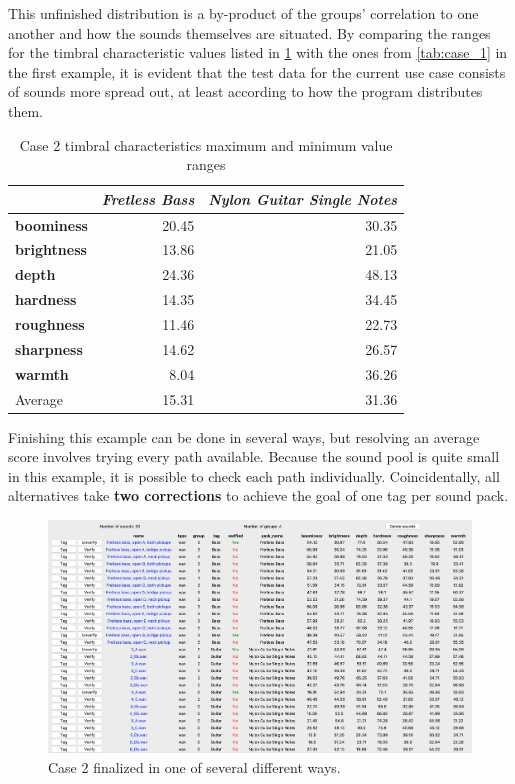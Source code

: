 This unfinished distribution is a by-product of the groups' correlation to one another and how the sounds themselves are situated. By comparing the ranges for the timbral characteristic values listed in \cref{tab:case_2} with the ones from \cref{tab:case_1} in the first example, it is evident that the test data for the current use case consists of sounds more spread out, at least according to how the program distributes them.
\begin{table}[ht]
    \caption[Case 2 timbral characteristics max and min ranges]{Case 2 timbral characteristics maximum and minimum value ranges}\label{tab:case_2}
    \begin{tabular*}{\textwidth}{@{\extracolsep{\fill}}lrr}
        \toprule
        & \emph{Fretless Bass} & \emph{Nylon Guitar Single Notes} \\
        \midrule
        \textbf{boominess} & 20.45 & 30.35 \\
        \textbf{brightness} & 13.86 & 21.05 \\
        \textbf{depth} & 24.36 & 48.13 \\
        \textbf{hardness} & 14.35 & 34.45 \\
        \textbf{roughness} & 11.46 & 22.73 \\
        \textbf{sharpness} & 14.62 & 26.57 \\
        \textbf{warmth} & 8.04 & 36.26 \\
        \midrule
        Average & 15.31 & 31.36 \\
        \bottomrule
    \end{tabular*}
\end{table}

\newpage Finishing this example can be done in several ways, but resolving an average score involves trying every path available. Because the sound pool is quite small in this example, it is possible to check each path individually. Coincidentally, all alternatives take \textbf{two corrections} to achieve the goal of one tag per sound pack.
\begin{figure}[ht]
    \includegraphics[width=\textwidth]{figures/case_2/finalized}
    \caption{Case 2 finalized in one of several different ways.}\label{fig:case_2/finalized}
\end{figure}
\clearpage

